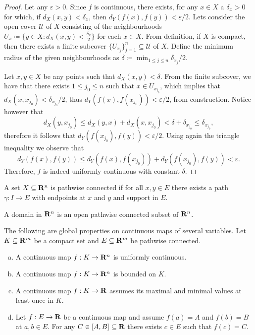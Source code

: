 \begin{proof}
Let any \(\varepsilon > 0\). Since \(f\) is continuous, there exists, for any
\(x \in X\) a \(\delta_x > 0\) for which, if \(d_X(x, y) < \delta_x\), then
\(d_Y(f(x), f(y)) < \varepsilon/2\). Lets consider the open cover \(\mathcal U\)
of \(X\) consisting of the neighbourhoods \(U_x \coloneq \{y \in X \colon d_{X}(x, y)
< \frac {\delta_{x}} 2\}\) for each \(x \in X\). From definition, if \(X\) is
compact, then there exists a finite subcover \(\{U_{x_j}\}_{j=1}^n \subseteq
\mathcal U\) of \(X\). Define the minimum radius of the given neighbourhoods as
\(\delta \coloneq \min_{1 \leq j \leq n} \delta_{x_j}/2\).

Let \(x, y \in X\) be any points such that \(d_X(x, y) < \delta\). From the
finite subcover, we have that there exists \(1 \leq j_0 \leq n\) such that \(x
\in U_{x_{j_0}}\), which implies that \(d_X(x, x_{j_0}) < \delta_{x_{j_0}}/2\),
thus \(d_Y(f(x), f(x_{j_0})) < \varepsilon/2\), from construction. Notice however
that
\[
  d_X(y, x_{j_0}) \leq d_X(y, x) + d_X(x, x_{j_0})
  < \delta + \delta_{x_{j_0}}
  \leq \delta_{x_{j_0}},
\]
therefore it follows that \(d_Y(f(x_{j_0}), f(y)) < \varepsilon/2\). Using again
the triangle inequality we observe that
\[
  d_Y(f(x), f(y)) \leq d_Y(f(x), f(x_{j_0})) + d_Y(f(x_{j_0}), f(y))
  < \varepsilon.
\]
Therefore, \(f\) is indeed uniformly continuous with constant \(\delta\).
\end{proof}

\begin{definition}\label{def: path-connected}
A set \(X \subseteq \mathbf{R}^n\) is pathwise connected if for all \(x, y \in E\)
there exists a path \(\gamma: I \to E\) with endpoints at \(x\) and \(y\) and
support in \(E\).
\end{definition}

\begin{definition}[Domain]\label{def: domain}
A domain in \(\mathbf{R}^n\) is an open pathwise connected subset of \(\mathbf{R}^n\).
\end{definition}

\begin{proposition}
\label{prop:global-properties-continuous-on-compact}
The following are global properties on continuous maps of several
variables. Let \(K \subseteq \mathbf{R}^m\) be a compact set and \(E \subseteq \mathbf{R}^m\)
be pathwise connected.
\begin{enumerate}[(a)]
\item A continuous map \(f: K \to \mathbf{R}^n\) is uniformly continuous.
\item A continuous map \(f: K \to \mathbf{R}^n\) is bounded on \(K\).
\item A continuous map \(f: K \to \mathbf{R}\) assumes its maximal and minimal
    values at least once in \(K\).
\item Let \(f: E \to \mathbf{R}\) be a continuous map and assume \(f(a) = A\) and
    \(f(b) = B\) at \(a, b \in E\). For any \(C \in [A, B] \subseteq \mathbf{R}\)
    there exists \(c \in E\) such that \(f(c) = C\).
\end{enumerate}
\end{proposition}

